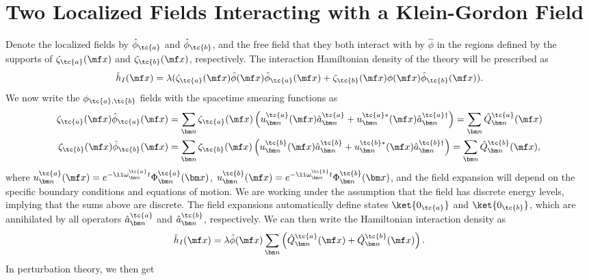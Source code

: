 {


\chapter{Two Localized Fields Interacting with a Klein-Gordon Field}\label{app:twoQFTs}

Denote the localized fields by $\hat{\phi}_\tc{a}$ and $\hat{\phi}_\tc{b}$, and the free field that they both interact with by $\hat{\phi}$ in the regions defined by the supports of $\zeta_\tc{a}(\mf x)$ and $\zeta_\tc{b}(\mf x)$, respectively. The interaction Hamiltonian density of the theory will be prescribed as
\begin{equation}
    \hat{h}_I(\mf x) = \lambda  (\zeta_\tc{a}(\mf x)\hat{\phi}(\mf x)\hat{\phi}_\tc{a}(\mf x) + \zeta_\tc{b}(\mf x)\phi(\mf x) \hat{\phi}_\tc{b}(\mf x)).
\end{equation}
We now write the $\phi_{\tc{a},\tc{b}}$ fields with the spacetime smearing functions as
\begin{align}
\zeta_\tc{a}(\mf x)\hat{\phi}_\tc{a}(\mf x) &= \sum_{\bm n} \zeta_\tc{a}(\mf x)\left( u_{\bm n}^{\tc{a}}(\mf x) \hat{a}_{\bm n}^\tc{a} +  u^{\tc{a}*}_{\bm n}(\mf x)\hat{a}^{\tc{a}\dagger}_{\bm n} \right) = \sum_{\bm n} \hat{Q}^{\tc{a}}_{\bm n}(\mf x)\\
\zeta_\tc{b}(\mf x)\hat{\phi}_\tc{b}(\mf x) &= \sum_{\bm n} \zeta_\tc{b}(\mf x)\left( u_{\bm n}^{\tc{b}}(\mf x) \hat{a}_{\bm n}^\tc{b} +  u^{\tc{b}*}_{\bm n}(\mf x) \hat{a}_{\bm n}^{\tc{b}\dagger} \right) = \sum_{\bm n}   \hat{Q}_{\bm n}^\tc{b}(\mf x),
\end{align}
where $u_{\bm n}^{\tc{a}}(\mf x) = e^{-\ii \omega_{\bm n}^{\tc{a}} t}\Phi^\tc{a}_{\bm n}(\bm x)$, $u_{\bm n}^{\tc{b}}(\mf x) = e^{-\ii \omega_{\bm n}^{\tc{b}} t}\Phi_{\bm n}^{\tc{b}}(\bm x)$, and the field expansion will depend on the specific boundary conditions and equations of motion. We are working under the assumption that the field has discrete energy levels, implying that the sums above are discrete. The field expansions automatically define states $\ket{0_\tc{a}}$ and $\ket{0_\tc{b}}$, which are annihilated by all operators $\hat{a}_{\bm n}^\tc{a}$ and $\hat{a}_{\bm n}^\tc{b}$, respectively. We can then write the Hamiltonian interaction density as
\begin{equation}
    \hat{h}_I(\mf x) = \lambda\hat{\phi}(\mf x) \sum_{\bm n} \left(\hat{Q}_{\bm n}^{\tc{a}}(\mf x) +  \hat{Q}_{\bm n}^\tc{b}(\mf x)\right).
\end{equation}
In perturbation theory, we then get
}
